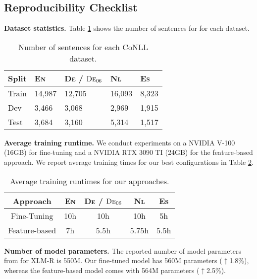 \subsection{Reproducibility Checklist}

\noindent 
\textbf{Dataset statistics.} Table \ref{tab:dataset_stats} shows the number of sentences for for each dataset.

\begin{table}[h!]
\centering
\begin{tabular}{lllll}
\hline
 Split       &  \textsc{En} & \textsc{De} / $\textsc{De}_{06}$ & \textsc{Nl} & \textsc{Es} \\ \hline
 Train       & 14,987       & 12,705                           & 16,093      & 8,323 \\
 Dev         & 3,466        & 3,068                            & 2,969       & 1,915 \\
 Test        & 3,684        & 3,160                            & 5,314       & 1,517 \\
 \hline
\end{tabular}%
\caption{Number of sentences for each CoNLL dataset.}
\label{tab:dataset_stats}
\end{table}

\noindent
\textbf{Average training runtime.} We conduct experiments on a NVIDIA V-100 (16GB) for fine-tuning and a NVIDIA RTX 3090 TI (24GB) for the feature-based approach. We report average training times for our best configurations in Table \ref{tab:training_runtimes}.

\begin{table}[h!]
\centering
\begin{tabular}{ccccc}
\hline
 Approach       &  \textsc{En} & \textsc{De} / $\textsc{De}_{06}$ & \textsc{Nl} & \textsc{Es} \\ \hline
 Fine-Tuning    &  10h            & 10h                        & 10h             &  5h \\
 Feature-based  &  7h          &  5.5h                 &  5.75h      & 5.5h \\
 \hline
\end{tabular}%
\caption{Average training runtimes for our approaches.}
\label{tab:training_runtimes}
\end{table}

\noindent
\textbf{Number of model parameters.} The reported number of model parameters from \citet{conneau2019unsupervised} for XLM-R is 550M. Our fine-tuned model has 560M parameters ($\uparrow$1.8\%), whereas the feature-based model comes with 564M parameters ($\uparrow$2.5\%).

